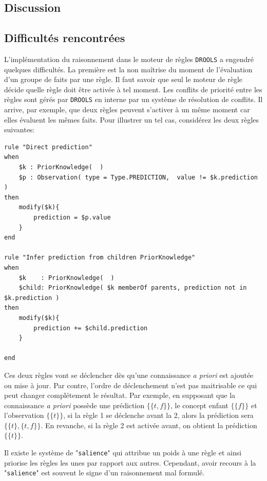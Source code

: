 \begin{refsegment}


\section{Discussion}
\subsection{Difficultés rencontrées}
L'implémentation du raisonnement dans le moteur de règles \texttt{DROOLS} a engendré quelques difficultés. La première est la non maîtrise du moment de l'évaluation d'un groupe de faits par une règle. Il faut savoir que seul le moteur de règle décide quelle règle doit être activée à tel moment. Les conflits de priorité entre les règles sont gérés par \texttt{DROOLS} en interne par un système de résolution de conflits. Il arrive, par exemple, que deux règles peuvent s'activer à un même moment car elles évaluent les mêmes faits. Pour illustrer un tel cas, considérez les deux règles suivantes:

\begin{lstlisting}[style=drl-style,caption=conflit]
rule "Direct prediction"
when
	$k : PriorKnowledge(  )
	$p : Observation( type = Type.PREDICTION,  value != $k.prediction )
then
	modify($k){
		prediction = $p.value
	}
end

rule "Infer prediction from children PriorKnowledge"
when
	$k    : PriorKnowledge(  )
	$child: PriorKnowledge( $k memberOf parents, prediction not in $k.prediction )
then
	modify($k){
		prediction += $child.prediction
	}

end
\end{lstlisting}

Ces deux règles vont se déclencher dès qu'une connaissance \textit{a priori} est ajoutée ou mise à jour. Par contre, l'ordre de déclenchement n'est pas maitrisable ce qui peut changer complétement le résultat. Par exemple, en supposant que la connaissance \textit{a priori}  possède une prédiction $\{\{t,f\}\}$, le concept enfant  $\{\{f\}\}$ et l'observation $\{\{t\}\}$, si la règle 1 se déclenche avant la 2, alors la prédiction sera $\{\{t\},\{t,f\}\}$. En revanche, si la règle 2 est activée avant, on obtient la prédiction  $\{\{t\}\}$.

Il existe le système de "\texttt{salience}" qui attribue un poids à une règle et ainsi priorise les règles les unes par rapport aux autres.  Cependant, avoir recours à la "\texttt{salience}" est souvent le signe d'un raisonnement mal formulé.


\end{refsegment}

